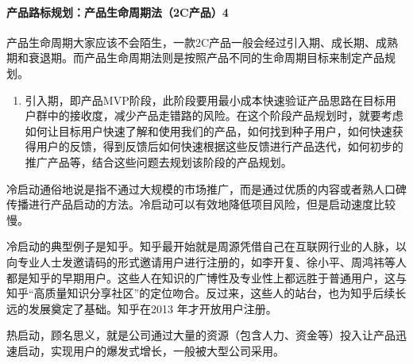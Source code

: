 \documentclass[letterpaper,11pt,english]{sphinxmanual}
\begin{document}
\paragraph{产品路标规划：产品生命周期法（2C产品）4\sphinxfootnotemark[36]}
\label{\detokenize{chapter_introduction/2C:c-4}}%
\begin{footnotetext}[36]\sphinxAtStartFootnote
{}
%
\end{footnotetext}\ignorespaces 
产品生命周期大家应该不会陌生，一款2C产品一般会经过引入期、成长期、成熟期和衰退期。而产品生命周期法则是按照产品不同的生命周期目标来制定产品规划。
\begin{enumerate}
%
\item {} 
引入期，即产品MVP阶段，此阶段要用最小成本快速验证产品思路在目标用户群中的接收度，减少产品走错路的风险。在这个阶段产品规划时，就要考虑如何让目标用户快速了解和使用我们的产品，如何找到种子用户，如何快速获得用户的反馈，得到反馈后如何快速根据这些反馈进行产品迭代，如何初步的推广产品等，结合这些问题去规划该阶段的产品规划。

\end{enumerate}

冷启动通俗地说是指不通过大规模的市场推广，而是通过优质的内容或者熟人口碑传播进行产品启动的方法。冷启动可以有效地降低项目风险，但是启动速度比较慢。

冷启动的典型例子是知乎。知乎最开始就是周源凭借自己在互联网行业的人脉，以向专业人士发邀请码的形式邀请用户进行注册的，如李开复、徐小平、周鸿祎等人都是知乎的早期用户。这些人在知识的广博性及专业性上都远胜于普通用户，这与知乎“高质量知识分享社区”的定位吻合。反过来，这些人的站台，也为知乎后续长远的发展奠定了基础。知乎在2013
年才开放用户注册。

热启动，顾名思义，就是公司通过大量的资源（包含人力、资金等）投入让产品迅速启动，实现用户的爆发式增长，一般被大型公司采用。
\end{document}
